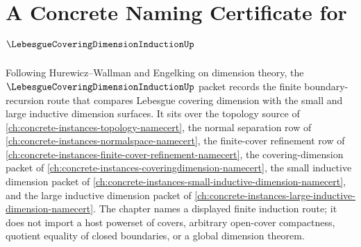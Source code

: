 \chapter{A Concrete Naming Certificate for $\LebesgueCoveringDimensionInductionUp$}
\label{ch:concrete-instances-lebesgue-covering-dimension-induction-namecert}

Following Hurewicz--Wallman and Engelking on dimension theory, the $\LebesgueCoveringDimensionInductionUp$ packet records the finite boundary-recursion route that compares Lebesgue covering dimension with the small and large inductive dimension surfaces. It sits over the topology source of \autoref{ch:concrete-instances-topology-namecert}, the normal separation row of \autoref{ch:concrete-instances-normalspace-namecert}, the finite-cover refinement row of \autoref{ch:concrete-instances-finite-cover-refinement-namecert}, the covering-dimension packet of \autoref{ch:concrete-instances-coveringdimension-namecert}, the small inductive dimension packet of \autoref{ch:concrete-instances-small-inductive-dimension-namecert}, and the large inductive dimension packet of \autoref{ch:concrete-instances-large-inductive-dimension-namecert}. The chapter names a displayed finite induction route; it does not import a host powerset of covers, arbitrary open-cover compactness, quotient equality of closed boundaries, or a global dimension theorem.

